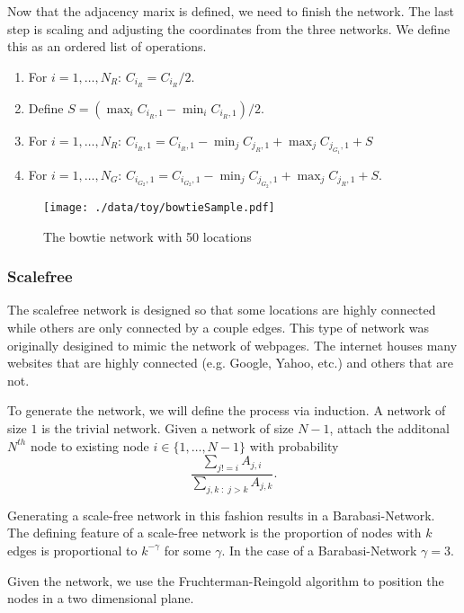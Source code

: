 \documentclass[11pt]{article}
\begin{document}
Now that the adjacency marix is defined, we need to finish the
network.  The last step is scaling and adjusting the coordinates from
the three networks.  We define this as an ordered list of operations.
\begin{enumerate}
  \item For $i=1,\ldots,N_R$: $C_{i_{R}} = C_{i_{R}}/2$.
  \item Define $S = (\max_i C_{i_{R},1} - \min_i C_{i_{R},1})/2$.
  \item For $i=1,\ldots,N_R$: $C_{i_{R},1} = C_{i_{R},1} -
  \min_j C_{j_{R},1} + \max_j C_{j_{G_1},1} + S$
  \item For $i=1,\ldots,N_G$:
  $C_{i_{G_2},1} = C_{i_{G_2},1} - \min_j C_{j_{G_2},1} + \max_j
  C_{j_{R},1} + S$.
\end{enumerate}


\begin{figure}[htb]
\centering
\texttt{[image: ./data/toy/bowtieSample.pdf]}
\caption{\label{fig:bowtie25}The bowtie network with 50 locations}
\end{figure}


\subsubsection{Scalefree}
\label{sec-3-1-6}

The scalefree network is designed so that some locations are highly
connected while others are only connected by a couple edges.  This
type of network was originally desigined to mimic the network of
webpages.  The internet houses many websites that are highly
connected (e.g. Google, Yahoo, etc.) and others that are not.

To generate the network, we will define the process via induction.  A
network of size $1$ is the trivial network.  Given a network of size
$N-1$, attach the additonal $N^{th}$ node to existing node $i \in
\lbrace 1,\ldots,N-1\rbrace$ with probability
\begin{equation*}
  \frac{\sum_{j!=i} A_{j,i}}{\sum_{j,k \;:\; j > k} A_{j,k}}.
\end{equation*}

Generating a scale-free network in this fashion results in a
Barabasi-Network.  The defining feature of a scale-free network is the
proportion of nodes with $k$ edges is proportional to $k^{-\gamma}$
for some $\gamma$.  In the case of a Barabasi-Network $\gamma = 3$.

Given the network, we use the Fruchterman-Reingold algorithm to
position the nodes in a two dimensional plane.
\end{document}
